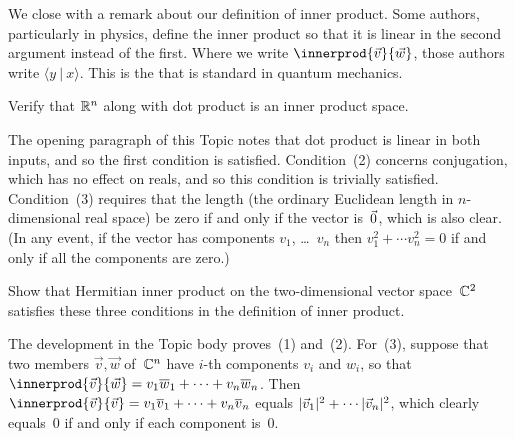 We close with a remark about our definition of inner product.
Some authors, particularly in physics, define the inner product 
so that it is linear in the second argument instead of the first. 
Where we write $\innerprod{\vec{v}}{\vec{w}}$, 
those authors write $\langle y\ |\ x\rangle$. 
This is the
that is standard in quantum mechanics.

\begin{exercises}
\item 
Verify that $\mathbb{R}^n$ along with dot product is an inner product space.
\begin{answer}
The opening paragraph of this Topic notes that dot product is linear
in both inputs, and so the first condition is satisfied.
Condition~(2) concerns conjugation, 
which has no effect on reals, and 
so this condition is trivially satisfied. 
Condition~(3) requires that the length (the ordinary Euclidean length
in $n$-dimensional real space) be zero if and only if the vector is~$\vec{0}$,
which is also clear.
(In any event, if the vector has components $v_1$, \ldots~$v_n$ then
$v_1^2+\cdots v_n^2=0$ if and only if all the components are zero.) 
\end{answer}

\item
Show that Hermitian inner product on the two-dimensional vector space~$\mathbb{C}^2$ 
satisfies these three conditions in the definition of inner product. 
\begin{answer}
The development in the Topic body proves~(1) and~(2).
For~(3), suppose that 
two members  $\vec{v},\vec{w}$ of~$\mathbb{C}^n$
have $i$-th components $v_i$ and $w_i$, so that
$\innerprod{\vec{v}}{\vec{w}}=v_1\compconj{w}_1+\cdots+v_n\compconj{w}_n$.
Then $\innerprod{\vec{v}}{\vec{v}}=v_1\compconj{v}_1+\cdots+v_n\compconj{v}_n$
equals $\lvert\vec{v}_1\rvert^2+\cdots \lvert\vec{v}_n\rvert^2$, 
which clearly equals~$0$ if and only if each component is~$0$.
\end{answer}


\end{exercises}
